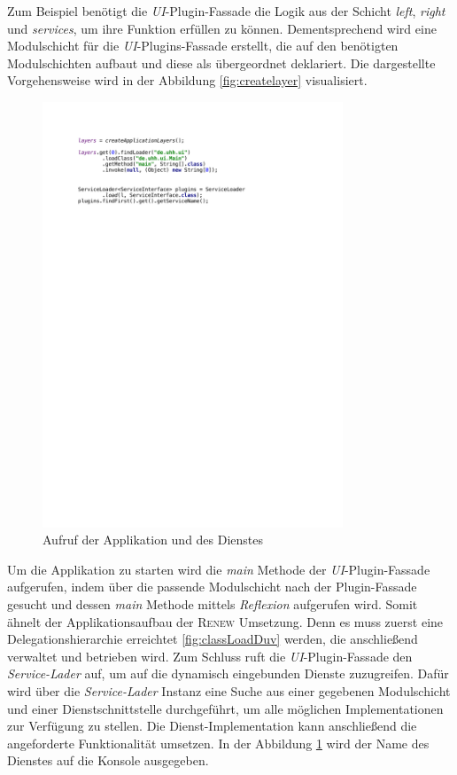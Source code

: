 	Zum Beispiel benötigt die \textit{UI}-Plugin-Fassade die Logik aus der Schicht \textit{left}, \textit{right} und \textit{services}, um ihre Funktion erfüllen zu können. Dementsprechend wird eine Modulschicht für die \textit{UI}-Plugins-Fassade erstellt, die auf den benötigten Modulschichten aufbaut und diese als übergeordnet deklariert. Die dargestellte Vorgehensweise wird in der Abbildung \ref{fig:createlayer} visualisiert.\newpage
	\begin{figure}[h!]
		   \centering
		   \captionsetup{justification=centering}
		   \includegraphics[width=0.8\textwidth]{material/images/umsetzung/main.pdf}
		    \caption{Aufruf der Applikation und des Dienstes}
		   \label{fig:figgi}
	\end{figure}
	Um die Applikation zu starten wird die \textit{main} Methode der \textit{UI}-Plugin-Fassade aufgerufen, indem über die passende Modulschicht nach der Plugin-Fassade gesucht und dessen \textit{main} Methode mittels \textit{Reflexion} aufgerufen wird. Somit ähnelt der Applikationsaufbau der \textsc{Renew} Umsetzung. Denn es muss zuerst eine Delegationshierarchie erreichtet \ref{fig:classLoadDuv} werden, die anschließend verwaltet und betrieben wird. \newline
	Zum Schluss ruft die \textit{UI}-Plugin-Fassade den \textit{Service-Lader} auf, um auf die dynamisch eingebunden Dienste zuzugreifen. Dafür wird über die \textit{Service-Lader} Instanz eine Suche aus einer gegebenen Modulschicht und einer Dienstschnittstelle durchgeführt, um alle möglichen Implementationen zur Verfügung zu stellen. Die Dienst-Implementation kann anschließend die angeforderte Funktionalität umsetzen. In der Abbildung \ref{fig:figgi} wird der Name des Dienstes auf die Konsole ausgegeben. \bigbreak 

